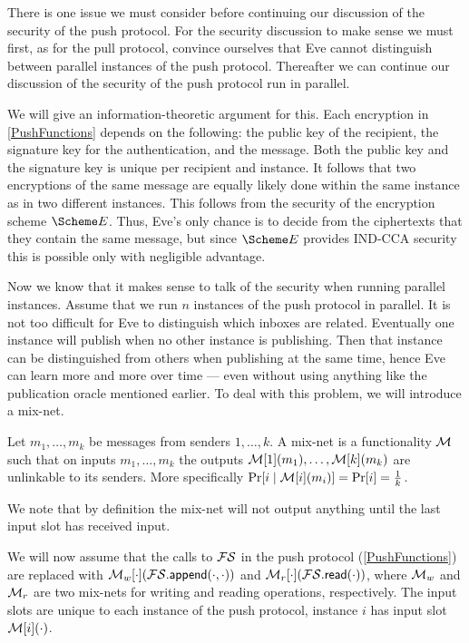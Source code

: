 There is one issue we must consider before continuing our discussion of the 
security of the push protocol.
For the security discussion to make sense we must first, as for the pull 
protocol, convince ourselves that Eve cannot distinguish between parallel 
instances of the push protocol.
Thereafter we can continue our discussion of the security of the push protocol 
run in parallel.

We will give an information-theoretic argument for this.
Each encryption in \cref{PushFunctions} depends on the following:
the public key of the recipient, the signature key for the authentication, 
and the message.
Both the public key and the signature key is unique per recipient and instance.
It follows that two encryptions of the same message are equally likely done 
within the same instance as in two different instances.
This follows from the security of the encryption scheme \(\E\).
Thus, Eve's only chance is to decide from the ciphertexts that they contain the 
same message, but since \(\E\) provides IND-CCA security this is possible only 
with negligible advantage.

Now we know that it makes sense to talk of the security when running parallel 
instances.
Assume that we run \(n\) instances of the push protocol in parallel.
It is not too difficult for Eve to distinguish which inboxes are related.
Eventually one instance will publish when no other instance is publishing.
Then that instance can be distinguished from others when publishing at the same
time, hence Eve can learn more and more over time --- even without using 
anything like the publication oracle mentioned earlier.
To deal with this problem, we will introduce a mix-net.

\begin{definition}\label{MixNet}
  Let \(m_1, \ldots, m_k\) be messages from senders \(1, \ldots, k\).
  A mix-net is a functionality \(\operatorname{\mathcal{M}}\) such that on inputs \(m_1, \ldots, m_k\) 
  the outputs \(\operatorname{\mathcal{M}}[1](m_1), \ldots, \operatorname{\mathcal{M}}[k](m_k)\) are unlinkable to its senders.
  More specifically \(\Pr[i\mid \operatorname{\mathcal{M}}[i](m_i)] = \Pr[i] = \frac{1}{k}\).
\end{definition}

We note that by definition the mix-net will not output anything until the last
input slot has received input.

We will now assume that the calls to \(\FS\) in the push protocol 
(\cref{PushFunctions}) are replaced with 
\(\M_w[\cdot](\fswrite[\cdot][\cdot])\) and \(\M_r[\cdot](\fsread[\cdot])\), 
where \(\operatorname{\mathcal{M}}_w\) and \(\operatorname{\mathcal{M}}_r\) are two mix-nets for writing and reading 
operations, respectively.
The input slots are unique to each instance of the push protocol, instance 
\(i\) has input slot \(\operatorname{\mathcal{M}}[i](\cdot)\).

